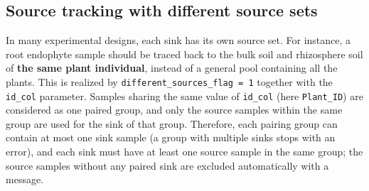 \documentclass[
]{book}
\newenvironment{Shaded}{\begin{snugshade}}{\end{snugshade}}
\newcommand{\CommentTok}[1]{\textcolor[rgb]{0.56,0.35,0.01}{\textit{#1}}}
\newcommand{\DecValTok}[1]{\textcolor[rgb]{0.00,0.00,0.81}{#1}}
\newcommand{\FunctionTok}[1]{\textcolor[rgb]{0.13,0.29,0.53}{\textbf{#1}}}
\newcommand{\NormalTok}[1]{#1}
\newcommand{\SpecialCharTok}[1]{\textcolor[rgb]{0.81,0.36,0.00}{\textbf{#1}}}
\newcommand{\StringTok}[1]{\textcolor[rgb]{0.31,0.60,0.02}{#1}}
\begin{document}
\begin{Shaded}
\end{Shaded}

\subsection{Source tracking with different source sets}\label{source-tracking-with-different-source-sets}

In many experimental designs, each sink has its own source set.
For instance, a root endophyte sample should be traced back to the bulk soil and rhizosphere soil of
\textbf{the same plant individual}, instead of a general pool containing all the plants.
This is realized by \texttt{different\_sources\_flag\ =\ 1} together with the \texttt{id\_col} parameter.
Samples sharing the same value of \texttt{id\_col} (here \texttt{Plant\_ID}) are considered as one paired group,
and only the source samples within the same group are used for the sink of that group.
Therefore, each pairing group can contain at most one sink sample
(a group with multiple sinks stops with an error),
and each sink must have at least one source sample in the same group;
the source samples without any paired sink are excluded automatically with a message.
\end{document}
